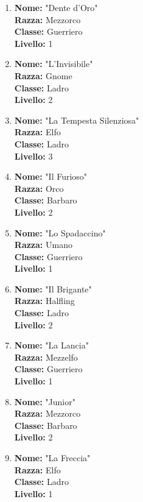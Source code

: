 \documentclass{article}
\begin{document}
\begin{enumerate}
  \item \textbf{Nome:} "Dente d'Oro"\\
  \textbf{Razza:} Mezzorco\\
  \textbf{Classe:} Guerriero\\
  \textbf{Livello:} 1

  \item \textbf{Nome:} "L'Invisibile"\\
  \textbf{Razza:} Gnome\\
  \textbf{Classe:} Ladro\\
  \textbf{Livello:} 2

  \item \textbf{Nome:} "La Tempesta Silenziosa"\\
  \textbf{Razza:} Elfo\\
  \textbf{Classe:} Ladro\\
  \textbf{Livello:} 3

  \item \textbf{Nome:} "Il Furioso"\\
  \textbf{Razza:} Orco\\
  \textbf{Classe:} Barbaro\\
  \textbf{Livello:} 2

  \item \textbf{Nome:} "Lo Spadaccino"\\
  \textbf{Razza:} Umano\\
  \textbf{Classe:} Guerriero\\
  \textbf{Livello:} 1

  \item \textbf{Nome:} "Il Brigante"\\
  \textbf{Razza:} Halfling\\
  \textbf{Classe:} Ladro\\
  \textbf{Livello:} 2

 \item \textbf{Nome:} "La Lancia"\\
  \textbf{Razza:} Mezzelfo\\
  \textbf{Classe:} Guerriero\\
  \textbf{Livello:} 1

\item \textbf{Nome:} "Junior"\\
  \textbf{Razza:} Mezzorco\\
  \textbf{Classe:} Barbaro\\
  \textbf{Livello:} 2

\item \textbf{Nome:} "La Freccia"\\
  \textbf{Razza:} Elfo\\
  \textbf{Classe:} Ladro\\
  \textbf{Livello:} 1


\end{enumerate}
\end{document}
